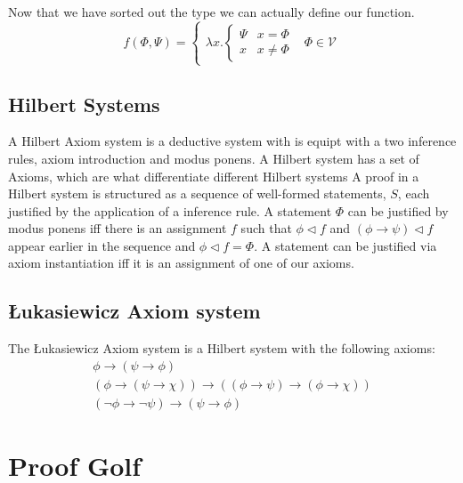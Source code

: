 \documentclass{article}
\begin{document}
Now that we have sorted out the type we can actually define our function.
\begin{equation*}
f(\Phi,\Psi) = \begin{cases}
\lambda x . \begin{cases}
\Psi & x   =  \Phi \\
x    & x \neq \Phi
\end{cases} & \Phi \in \mathcal{V}
\end{cases}
\end{equation*}

\subsection{Hilbert Systems}

A Hilbert Axiom system is a deductive system with is equipt with a two inference rules, axiom introduction and modus ponens.
A Hilbert system has a set of Axioms, which are what differentiate different Hilbert systems
A proof in a Hilbert system is structured as a sequence of well-formed statements, $S$, each justified by the application of a inference rule.
A statement $\Phi$ can be justified by modus ponens iff there is an assignment $f$ such that $\phi\lhd f$ and $(\phi\rightarrow\psi)\lhd f$ appear earlier in the sequence and
$\phi\lhd f=\Phi$.
A statement can be justified via axiom instantiation iff it is an assignment of one of our axioms.

\subsection{\L ukasiewicz Axiom system}
The \L ukasiewicz Axiom system is a Hilbert system with the following axioms:
\begin{gather*}
\phi \rightarrow (\psi \rightarrow \phi) \\
(\phi\rightarrow(\psi\rightarrow\chi))\rightarrow((\phi\rightarrow\psi)\rightarrow(\phi\rightarrow\chi)) \\
(\neg\phi\rightarrow\neg\psi)\rightarrow(\psi\rightarrow\phi)
\end{gather*}

\section{Proof Golf}
\end{document}
